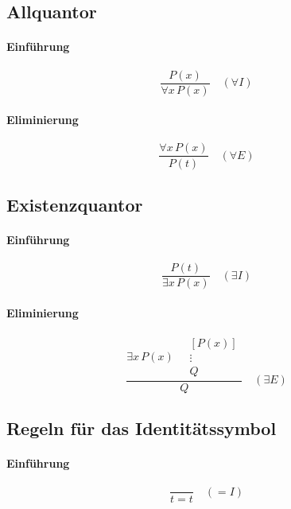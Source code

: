 \documentclass{book}
\theoremstyle{plain}
\theoremstyle{remark}
\theoremstyle{definition}
\begin{document}
\subsection{Allquantor}
\label{sec:forall-rules}

\paragraph{Einführung}
\label{rule:UI}

\[
\frac{P(x)}{\forall x\,P(x)}
\quad (\forall I)
\]

\paragraph{Eliminierung}
\label{rule:UE}

\[
\frac{\forall x\,P(x)}{P(t)}
\quad (\forall E)
\]

\subsection{Existenzquantor}
\label{sec:exists-rules}

\paragraph{Einführung}
\label{rule:EI}

\[
\frac{P(t)}{\exists x\,P(x)}
\quad (\exists I)
\]

\paragraph{Eliminierung}
\label{rule:EE}

\[
\frac{
  \exists x\,P(x)
  \quad
  \begin{array}{c}
    [P(x)]\\
    \vdots\\
    Q
  \end{array}
}{Q}
\quad (\exists E)
\]

\subsection{Regeln für das Identitätssymbol}
\label{sec:identity-rules}

\paragraph{Einführung}
\label{rule:II}

\[
\frac{\quad}{t=t}
\quad (=I)
\]
\end{document}
